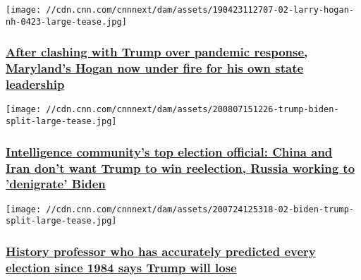 \texttt{[image: //cdn.cnn.com/cnnnext/dam/assets/190423112707-02-larry-hogan-nh-0423-large-tease.jpg]}

\hypertarget{after-clashing-with-trump-over-pandemic-response-marylands-hogan-now-under-fire-for-his-own-state-leadership-}{%
\subsubsection{\texorpdfstring{\href{/2020/08/08/politics/larry-hogan-coronavirus-schools-voting-elections/index.html}{After
clashing with Trump over pandemic response, Maryland's Hogan now under
fire for his own state leadership
}}{After clashing with Trump over pandemic response, Maryland's Hogan now under fire for his own state leadership }}\label{after-clashing-with-trump-over-pandemic-response-marylands-hogan-now-under-fire-for-his-own-state-leadership-}}

\href{/2020/08/07/politics/2020-election-russia-china-iran/index.html}{}

\texttt{[image: //cdn.cnn.com/cnnnext/dam/assets/200807151226-trump-biden-split-large-tease.jpg]}

\hypertarget{intelligence-communitys-top-election-official-china-and-iran-dont-want-trump-to-win-reelection-russia-working-to-denigrate-biden}{%
\subsubsection{\texorpdfstring{\href{/2020/08/07/politics/2020-election-russia-china-iran/index.html}{Intelligence
community's top election official: China and Iran don't want Trump to
win reelection, Russia working to 'denigrate'
Biden}}{Intelligence community's top election official: China and Iran don't want Trump to win reelection, Russia working to 'denigrate' Biden}}\label{intelligence-communitys-top-election-official-china-and-iran-dont-want-trump-to-win-reelection-russia-working-to-denigrate-biden}}

\href{/2020/08/07/us/allan-lichtman-trump-biden-2020-trnd/index.html}{}

\texttt{[image: //cdn.cnn.com/cnnnext/dam/assets/200724125318-02-biden-trump-split-large-tease.jpg]}

\hypertarget{history-professor-who-has-accurately-predicted-every-election-since-1984-says-trump-will-lose}{%
\subsubsection{\texorpdfstring{\href{/2020/08/07/us/allan-lichtman-trump-biden-2020-trnd/index.html}{History
professor who has accurately predicted every election since 1984 says
Trump will
lose}}{History professor who has accurately predicted every election since 1984 says Trump will lose}}\label{history-professor-who-has-accurately-predicted-every-election-since-1984-says-trump-will-lose}}

